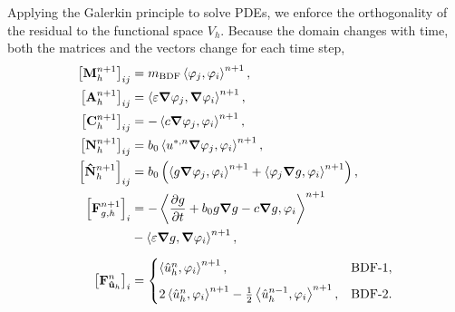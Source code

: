 \documentclass[../../thesis.tex]{subfiles}
\newcommand{\inner}[2]{\left<#1, #2\right>}
\begin{document}

Applying the Galerkin principle to solve PDEs, 
we enforce the orthogonality of the residual to the functional space $V_h$. 
Because the domain changes with time, 
both the matrices and the vectors change for each time step,
\begin{subequations}
    \label{eq:1d_fom_linear_system_operators}
    \begin{align}
        \left[\vb{M}_{h}^{n+1}\right]_{ij}           
        &= m_{\text{BDF}} \inner{\varphi_j}{\varphi_i}^{n+1}, 
        \\
        \left[\vb{A}_{h}^{n+1}\right]_{ij}           
        &= \inner{\varepsilon \grad \varphi_j}{\grad \varphi_i}^{n+1}, 
        \\
        \left[\vb{C}_{h}^{n+1}\right]_{ij}           
        &= -\inner{c \grad \varphi_j}{\varphi_i}^{n+1}, 
        \\
        \left[\vb{N}_{h}^{n+1}\right]_{ij}           
        &= b_0 \inner{u^{*, n} \grad \varphi_j}{\varphi_i}^{n+1}, 
        \label{eq:trilinear_weak_form}
        \\
        \left[\vb{\hat{N}}_{h}^{n+1}\right]_{ij}     
        &= b_0 \left(
            \inner{g \grad \varphi_j}{\varphi_i}^{n+1} + 
            \inner{\varphi_j \grad g}{\varphi_i}^{n+1}
            \right), 
        \\
        \left[\vb{F}_{{g,h}}^{n+1}\right]_{i}        
        &= -\inner{\pdv{g}{t} + b_0 g \grad g - c \grad g}{\varphi_i}^{n+1} \nonumber
        \\
        &  -\inner{\varepsilon \grad g}{\grad \varphi_i}^{n+1},
        \label{eq:1d_fom_linear_system_operators_fg}
        \\[2mm]
        \left[\vb{F}_{\vb{\hat{u}}_h}^{n}\right]_{i} &= 
            \begin{cases}
                \inner{\hat{u}_h^{n}}{\varphi_i}^{n+1},                &\text{BDF-1},
                \\[2mm]
                2\inner{\hat{u}_h^{n}}{\varphi_i}^{n+1}
                - \frac{1}{2}\inner{\hat{u}_h^{n-1}}{\varphi_i}^{n+1}, &\text{BDF-2}.
            \end{cases}
    \end{align}
\end{subequations}
\end{document}
